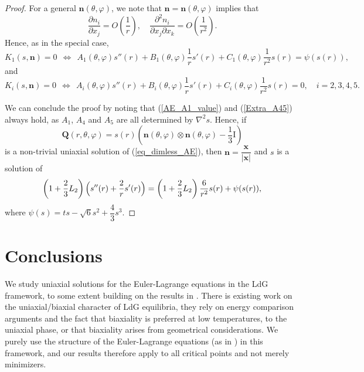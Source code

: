 \documentclass[10pt, a4paper]{article}
\newcommand\n{\mathbf{n}}
\newcommand\x{\mathbf{x}}
\newcommand\Qvec{\mathbf{Q}}
\newcommand\pp{\partial}
\begin{document}
\begin{proof}
For a general $\n(\theta, \varphi)$, we note that $\n = \n(\theta, \varphi)$ implies that
\begin{equation}
\dfrac{\pp n_i}{\pp x_j} = O \left( \frac{1}{r} \right), \quad \dfrac{\pp^2 n_i }{\pp x_j \pp x_k} = O \left( \dfrac{1}{r^2} \right).
\end{equation}
Hence, as in the special case, %
\begin{equation}\label{eq_K1}
K_1 (s, \n) = 0 ~~\Longleftrightarrow~~ A_1(\theta, \varphi) s''(r) + B_1(\theta, \varphi) \frac{1}{r} s'(r) + C_1(\theta, \varphi) \frac{1}{r^2} s(r) = \psi (s(r)), 
\end{equation}
and
\begin{equation}\label{eq_Ki}
K_i (s, \n) = 0 ~~\Longleftrightarrow~~ A_i(\theta, \varphi) s''(r) + B_i(\theta, \varphi) \frac{1}{r} s'(r) + C_i(\theta, \varphi) \frac{1}{r^2} s(r) = 0, \quad i = 2, 3, 4, 5.
\end{equation}

We can conclude the proof by noting that (\ref{AE_A1_value}) and (\ref{Extra_A45})  always hold, as $A_1$, $A_4$ and $A_5$ are all determined by $\nabla^2 s$.
Hence, if 
\begin{equation}
\Qvec(r, \theta, \varphi) = s(r) \left( \n(\theta, \varphi) \otimes \n (\theta, \varphi) - \frac{1}{3} \mathrm{I} \right)
\end{equation}  
is a non-trivial uniaxial solution of (\ref{eq_dimless_AE}), then $\n = \dfrac{\x}{|\x|}$ and $s$ is a solution of
\begin{equation}
\left( 1 + \frac{2}{3} L_2 \right) \Bigl( s''(r) + \frac{2}{r} s'(r) \Bigr) = \left( 1 + \frac{2}{3} L_2 \right)\frac{6}{r^2} s(r) + \psi(s(r)),
\end{equation}
where $\psi(s) = ts - \sqrt{6} s^2 + \dfrac{4}{3} s^3$.

\end{proof}



\section{Conclusions}\label{sec:conclusions}

We study uniaxial solutions for the Euler-Lagrange equations in the LdG framework, to some extent building on the results in \cite{lamy2015uniaxial}. There is existing work on the uniaxial/biaxial character of LdG equilibria, they rely on energy comparison arguments and the fact that biaxiality is preferred at low temperatures, to the uniaxial phase, or that biaxiality arises from geometrical considerations. We purely use the structure of the Euler-Lagrange equations (as in \cite{lamy2015uniaxial}) in this framework, and our results therefore apply to all critical points and not merely minimizers.
\end{document}
